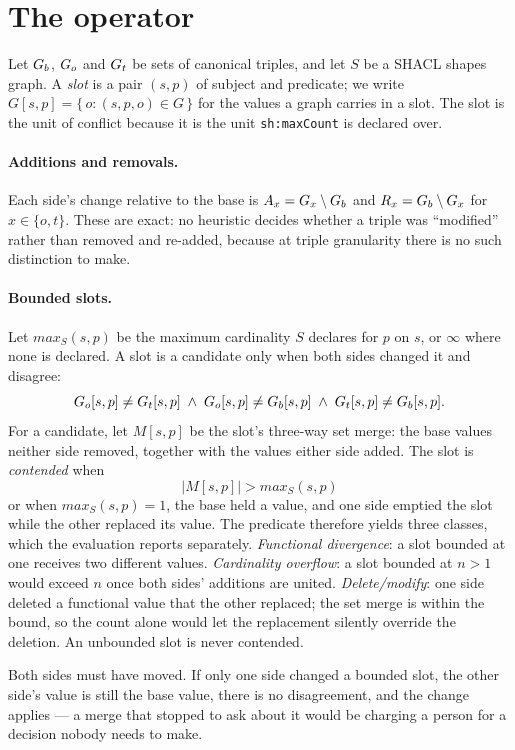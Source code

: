 \section{The operator}
\label{sec:operator}

Let $G_{b}$, $G_{o}$ and $G_{t}$ be sets of canonical triples, and let $S$ be a
SHACL shapes graph. A \emph{slot} is a pair $(s, p)$ of subject and predicate;
we write $G[s,p] = \{\, o : (s,p,o) \in G \,\}$ for the values a graph carries in
a slot. The slot is the unit of conflict because it is the unit
\texttt{sh:maxCount} is declared over.

\paragraph{Additions and removals.} Each side's change relative to the base is
$A_x = G_x \setminus G_{b}$ and $R_x = G_{b} \setminus G_x$ for $x \in
\{o, t\}$. These are exact: no heuristic decides whether a triple was
``modified'' rather than removed and re-added, because at triple granularity
there is no such distinction to make.

\paragraph{Bounded slots.} Let $\mathit{max}_S(s,p)$ be the maximum
cardinality $S$ declares for $p$ on $s$, or $\infty$ where none is declared. A
slot is a candidate only when both sides changed it and disagree:
\[
  G_{o}[s,p] \neq G_{t}[s,p]
  \;\wedge\;
  G_{o}[s,p] \neq G_{b}[s,p]
  \;\wedge\;
  G_{t}[s,p] \neq G_{b}[s,p].
\]
For a candidate, let $M[s,p]$ be the slot's three-way set merge: the base
values neither side removed, together with the values either side added. The
slot is \emph{contended} when
\[
  |M[s,p]| > \mathit{max}_S(s,p)
\]
or when $\mathit{max}_S(s,p) = 1$, the base held a value, and one side emptied
the slot while the other replaced its value. The predicate therefore yields
three classes, which the evaluation reports separately. \emph{Functional
divergence}: a slot bounded at one receives two different values.
\emph{Cardinality overflow}: a slot bounded at $n > 1$ would exceed $n$ once
both sides' additions are united. \emph{Delete/modify}: one side deleted a
functional value that the other replaced; the set merge is within the bound, so
the count alone would let the replacement silently override the deletion. An
unbounded slot is never contended.

Both sides must have moved. If only one side changed a bounded slot, the
other side's value is still the base value, there is no disagreement, and the
change applies --- a merge that stopped to ask about it would be charging a
person for a decision nobody needs to make.

